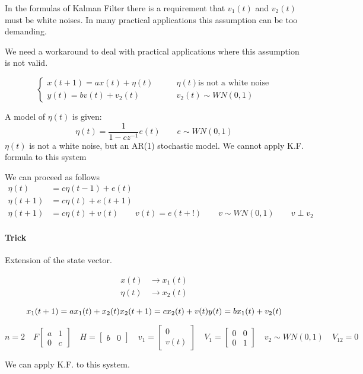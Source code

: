 
\begin{remark}
    In the formulas of Kalman Filter there is a requirement that $v_1(t)$ and $v_2(t)$ must be white noises.
    In many practical applications this assumption can be too demanding.

    We need a workaround to deal with practical applications where this assumption is not valid.

    \[
        \begin{cases}
            x(t+1) = ax(t) + \eta(t) \qquad & \eta(t) \text{is not a white noise}\\
            y(t) = bv(t) + v_2(t) \qquad & v_2(t) \sim WN(0,1)
        \end{cases}
    \]

    A model of $\eta(t)$ is given:
    \[
        \eta(t) = \frac{1}{1-cz^{-1}}e(t) \qquad e \sim WN(0,1)
    \]
    $\eta(t)$ is not a white noise, but an AR(1) stochastic model.
    We cannot apply K.F. formula to this system

    We can proceed as follows
    \begin{align*}
        \eta(t) &= c\eta(t-1) + e(t) \\
        \eta(t+1) &= c\eta(t) + e(t+1) \\
        \eta(t+1) &= c\eta(t) + v(t) \qquad v(t) = e(t+!) \qquad v \sim WN(0,1) \qquad v \perp v_2
    \end{align*}

    \paragraph{Trick} Extension of the state vector.

    \begin{align*}
        x(t) &\rightarrow x_1(t) \\
        \eta(t) &\rightarrow x_2(t)
    \end{align*}

    \[
        x_1(t+1) = ax_1(t) + x_2(t) \\
        x_2(t+1) = cx_2(t) + v(t) \\
        y(t) = bx_1(t) + v_2(t)
    \]

    \[
        n=2 \quad F\begin{bmatrix}
            a & 1 \\
            0 & c
        \end{bmatrix}
        \quad H = \begin{bmatrix}
            b & 0
        \end{bmatrix}
        \quad v_1 = \begin{bmatrix}
            0 \\ v(t)
        \end{bmatrix}
        \quad V_1 = \begin{bmatrix}
            0 & 0 \\
            0 & 1
        \end{bmatrix}
        \quad v_2 \sim WN(0,1)
        \quad V_{12} = 0
    \]

    We can apply K.F. to this system.
\end{remark}

